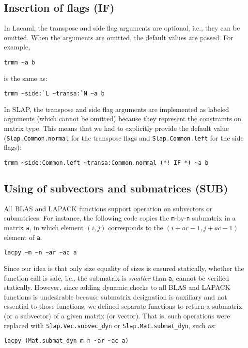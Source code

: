 \documentclass[10pt,a4paper]{article}
\begin{document}
\subsection{Insertion of flags (IF)}
\label{sec:IF}

In Lacaml, the transpose and side flag arguments are optional, i.e., they can be omitted.
When the arguments are omitted, the default values are passed. For example,
\begin{lstlisting}
trmm ~a b
\end{lstlisting}
is the same as:
\begin{lstlisting}
trmm ~side:`L ~transa:`N ~a b
\end{lstlisting}

In SLAP, the transpose and side flag arguments are implemented as labeled arguments
(which cannot be omitted) because they represent the constraints on matrix type.
This means that we had to explicitly provide the default value
(\lstinline|Slap.Common.normal| for the transpose flags and \lstinline|Slap.Common.left|
for the side flags):
\begin{lstlisting}
trmm ~side:Common.left ~transa:Common.normal (*! IF *) ~a b
\end{lstlisting}

\subsection{Using of subvectors and submatrices (SUB)}
\label{sec:SUB}

All BLAS and LAPACK functions support operation on subvectors or submatrices.
For instance, the following code copies the \lstinline|m|-by-\lstinline|n|
submatrix in a matrix \lstinline|a|, in which element $(i,j)$ corresponds to the
$(i+\mathit{ar}-1,j+\mathit{ac}-1)$ element of \lstinline|a|.
\begin{lstlisting}
lacpy ~m ~n ~ar ~ac a
\end{lstlisting}

Since our idea is that only size equality of sizes is ensured statically,
whether the function call is safe, i.e., the submatrix is \emph{smaller} than \lstinline|a|,
cannot be verified statically.
However, since adding dynamic checks to all BLAS and LAPACK functions is undesirable
because submatrix designation is auxiliary and not essential to those functions,
we defined separate functions to return a submatrix (or a subvector) of a given matrix (or vector).
That is, such operations were replaced with \lstinline|Slap.Vec.subvec_dyn|
or \lstinline|Slap.Mat.submat_dyn|, such as:
\begin{lstlisting}
lacpy (Mat.submat_dyn m n ~ar ~ac a)
\end{lstlisting}
\end{document}
